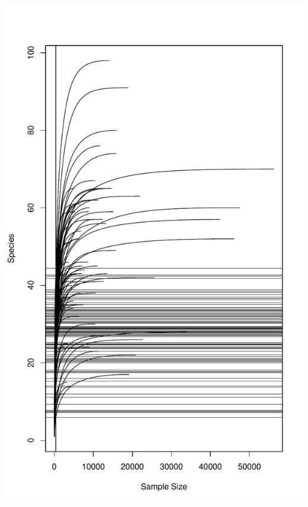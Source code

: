 \documentclass[
]{article}
\begin{document}
\includegraphics[width=1\linewidth]{manuscript_template_files/figure-latex/unnamed-chunk-20-5}
\end{document}
